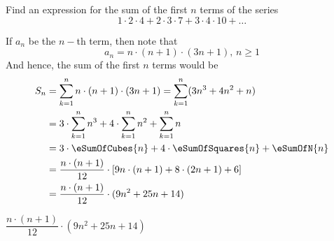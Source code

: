 

\question[4] Find an expression for the sum of the first $n$ terms of the series
\[ 1\cdot 2\cdot 4 + 2\cdot 3\cdot 7 + 3\cdot 4 \cdot 10 + \ldots \] 

\begin{solution}[\halfpage]
  If $a_n$ be the $n-$th term, then note that 
  \[ a_n = n\cdot (n+1) \cdot (3n + 1),\,n\geq 1 \] 
  And hence, the sum of the first $n$ terms would be 
	\begin{align}
		S_n &= \sum_{k=1}^{n}n\cdot(n+1)\cdot(3n+1) = \sum_{k=1}^{n}(3n^3 + 4n^2 + n) \\
		&= 3\cdot\sum_{k=1}^{n}n^3 + 4\cdot\sum_{k=1}^{n}n^2 + \sum_{k=1}^{n}n \\
		&= 3\cdot\eSumOfCubes{n} + 4\cdot\eSumOfSquares{n} + \eSumOfN{n} \\
		&= \dfrac{n\cdot(n+1)}{12}\cdot\left[ 9n\cdot(n+1) + 8\cdot(2n+1) + 6\right] \\
		&= \dfrac{n\cdot(n+1)}{12}\cdot(9n^2 + 25n + 14)
	\end{align}
\end{solution}
\ifprintanswers
  \begin{codex}
	  $\dfrac{n\cdot(n+1)}{12}\cdot(9n^2 + 25n + 14)$
  \end{codex}
\fi

